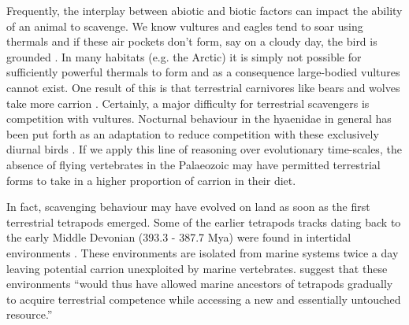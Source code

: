 \documentclass[a4paper,12pt]{article}
\begin{document}
Frequently, the interplay between abiotic and biotic factors can impact the ability of an animal to scavenge. 
We know vultures and eagles tend to soar using thermals and if these air pockets don't form, say on a cloudy day, the bird is grounded \citep{mundy1992vultures}.
In many habitats (e.g. the Arctic) it is simply not possible for sufficiently powerful thermals to form and as a consequence large-bodied vultures cannot exist.
One result of this is that terrestrial carnivores like bears and wolves take more carrion \citep{devault2003scavenging}.
Certainly, a major difficulty for terrestrial scavengers is competition with vultures.
Nocturnal behaviour in the hyaenidae in general has been put forth as an adaptation to reduce competition with these exclusively diurnal birds \citep{gittleman2013carnivore}.
If we apply this line of reasoning over evolutionary time-scales, the absence of flying vertebrates in the Palaeozoic may have permitted terrestrial forms to take in a higher proportion of carrion in their diet.

In fact, scavenging behaviour may have evolved on land as soon as the first terrestrial tetrapods emerged.
Some of the earlier tetrapods tracks dating back to the early Middle Devonian (393.3 - 387.7 Mya) were found in intertidal environments \citep{Niedzwiedzki2009}.
These environments are isolated from marine systems twice a day leaving potential carrion unexploited by marine vertebrates.
\cite{Niedzwiedzki2009} suggest that these environments ``would thus have allowed marine ancestors of tetrapods gradually to acquire terrestrial competence while accessing a new and essentially untouched resource.''

\end{document}
